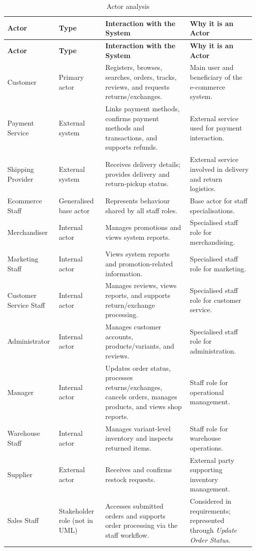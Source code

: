 \documentclass[11pt,a4paper,oneside]{extreport}
\begin{document}
{\small
\begin{xltabular}{\textwidth}{@{}L{2.6cm} L{2.4cm} Y L{3.6cm}@{}}
\caption{Actor analysis}\label{tab:actors}\\
\toprule
\textbf{Actor} & \textbf{Type} & \textbf{Interaction with the System} & \textbf{Why it is an Actor} \\ \midrule
\endfirsthead
\toprule
\textbf{Actor} & \textbf{Type} & \textbf{Interaction with the System} & \textbf{Why it is an Actor} \\ \midrule
\endhead
\bottomrule
\endlastfoot
Customer & Primary actor & Registers, browses, searches, orders, tracks, reviews, and requests returns/exchanges. & Main user and beneficiary of the e-commerce system. \\ \addlinespace
Payment Service & External system & Links payment methods, confirms payment methods and transactions, and supports refunds. & External service used for payment interaction. \\ \addlinespace
Shipping Provider & External system & Receives delivery details; provides delivery and return-pickup status. & External service involved in delivery and return logistics. \\ \addlinespace
Ecommerce Staff & Generalised base actor & Represents behaviour shared by all staff roles. & Base actor for staff specialisations. \\ \addlinespace
Merchandiser & Internal actor & Manages promotions and views system reports. & Specialised staff role for merchandising. \\ \addlinespace
Marketing Staff & Internal actor & Views system reports and promotion-related information. & Specialised staff role for marketing. \\ \addlinespace
Customer Service Staff & Internal actor & Manages reviews, views reports, and supports return/exchange processing. & Specialised staff role for customer service. \\ \addlinespace
Administrator & Internal actor & Manages customer accounts, products/variants, and reviews. & Specialised staff role for administration. \\ \addlinespace
Manager & Internal actor & Updates order status, processes returns/exchanges, cancels orders, manages products, and views shop reports. & Staff role for operational management. \\ \addlinespace
Warehouse Staff & Internal actor & Manages variant-level inventory and inspects returned items. & Staff role for warehouse operations. \\ \addlinespace
Supplier & External actor & Receives and confirms restock requests. & External party supporting inventory management. \\ \addlinespace
Sales Staff & Stakeholder role (not in UML) & Accesses submitted orders and supports order processing via the staff workflow. & Considered in requirements; represented through \emph{Update Order Status}. \\
\end{xltabular}
}
\end{document}
